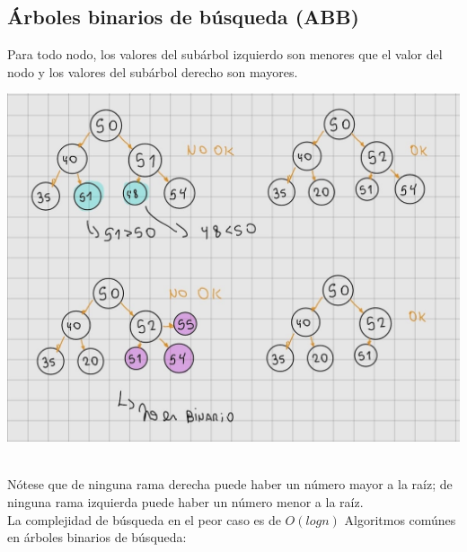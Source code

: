 \documentclass[10pt,a4paper]{article}
\begin{document}
\subsection*{Árboles binarios de búsqueda (ABB)}
Para todo nodo, los valores del subárbol izquierdo son menores que el valor del nodo y los valores del subárbol derecho son mayores. \\ 
\begin{minipage}[b]{0.8\textwidth}
    \includegraphics[width=\linewidth]{assets/abb-1.jpg}
    \centering
    \label{fig:abb-1}
\end{minipage} \\ 
Nótese que de ninguna rama derecha puede haber un número mayor a la raíz; de ninguna rama izquierda puede haber un número menor a la raíz. \\ 
La complejidad de búsqueda en el peor caso es de $O(log n)$
Algoritmos comúnes en árboles binarios de búsqueda:
\end{document}
